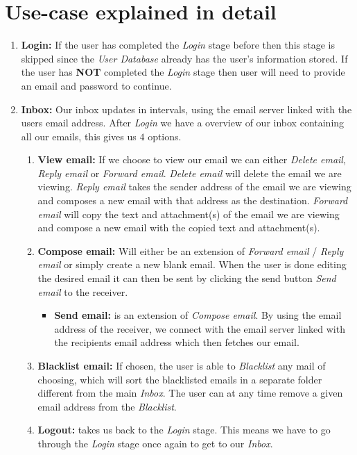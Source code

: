 \documentclass{article}
\begin{document}
\section*{Use-case explained in detail} 
\renewcommand{\labelenumii}{\arabic{enumi}.\arabic{enumii}}
\begin{enumerate} 
    \item \textbf{Login:} If the user has completed the \textit{Login} stage before then this stage is skipped since the \textit{User Database} already has the user's information stored. If the user has \textbf{NOT} completed the \textit{Login} stage then user will need to provide an email and password to continue.
    \item \textbf{Inbox:} Our inbox updates in intervals, using the email server linked with the users email address. After \textit{Login} we have a overview of our inbox containing all our emails, this gives us $4$ options.
    \begin{enumerate}
        \item \textbf{View email:} If we choose to view our email we can either \textit{Delete email}, \textit{Reply email} or \textit{Forward email}. \textit{Delete email} will delete the email we are viewing. \textit{Reply email} takes the sender address of the email we are viewing and composes a new email with that address as the destination. \textit{Forward email} will copy the text and attachment(s) of the email we are viewing and compose a new email with the copied text and attachment(s). 
        \item \textbf{Compose email:} Will either be an extension of \textit{Forward email} / \textit{Reply email} or simply create a new blank email. When the user is done editing the desired email it can then be sent by clicking the send button \textit{Send email} to the receiver.
        \begin{itemize}
            \item \textbf{Send email:} is an extension of \textit{Compose email}. By using the email address of the receiver, we connect with the email server linked with the recipients email address which then fetches our email. 
        \end{itemize}
        \item \textbf{Blacklist email:} If chosen, the user is able to \textit{Blacklist} any mail of choosing, which will sort the blacklisted emails in a separate folder different from the main \textit{Inbox}. The user can at any time remove a given email address from the \textit{Blacklist}.
        \item \textbf{Logout:} takes us back to the \textit{Login} stage. This means we have to go through the \textit{Login} stage once again to get to our \textit{Inbox}.
    \end{enumerate}
    
\end{enumerate}
\end{document}
